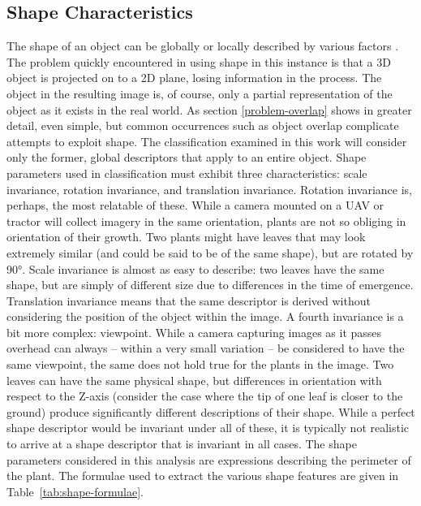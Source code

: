 \documentclass[letterpaper]{report}
\begin{document}
{\subsection{Shape Characteristics}
The shape of an object can be globally or locally described by various factors \parencite{Zhang2004-cm}. The problem quickly encountered in using shape in this instance is that a 3D object is projected on to a 2D plane, losing information in the process. The object in the resulting image is, of course, only a partial representation of the object as it exists in the real world. As section \ref{problem-overlap} shows in greater detail, even simple, but common occurrences such as object overlap complicate attempts to exploit shape. The classification examined in this work will consider only the former, global descriptors that apply to an entire object. Shape parameters used in classification must exhibit three characteristics: scale invariance, rotation invariance, and translation invariance. Rotation invariance is, perhaps, the most relatable of these. While a camera mounted on a UAV or tractor will collect imagery in the same orientation, plants are not so obliging in orientation of their growth. Two plants might have leaves that may look extremely similar (and could be said to be of the same shape), but are rotated by 90\si{\degree}. Scale invariance is almost as easy to describe: two leaves have the same shape, but are simply of different size due to differences in the time of emergence. Translation invariance means that the same descriptor is derived without considering the position of the object within the image.  A fourth invariance is a bit more complex: viewpoint. While a camera capturing images as it passes overhead can always -- within a very small variation -- be considered to have the same viewpoint, the same does not hold true for the plants in the image. Two leaves can have the same physical shape, but differences in orientation with respect to the Z-axis (consider the case where the tip of one leaf is closer to the ground) produce significantly different descriptions of their shape. While a perfect shape descriptor would be invariant under all of these, it is typically not realistic to arrive at a shape descriptor that is invariant in all cases.
The shape parameters considered in this analysis are expressions describing the perimeter of the plant. The formulae used to extract the various shape features are given in Table~\ref{tab:shape-formulae}.

}
\end{document}
